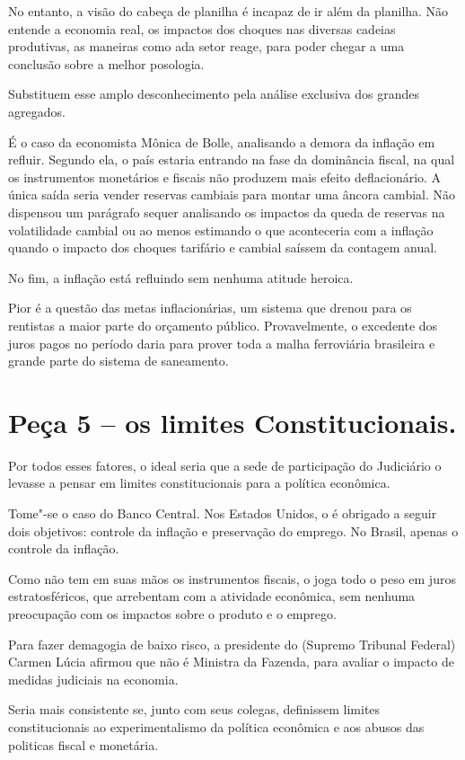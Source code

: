 No entanto, a visão do cabeça de planilha é incapaz de ir além da
planilha. Não entende a economia real, os impactos dos choques nas
diversas cadeias produtivas, as maneiras como ada setor reage, para
poder chegar a uma conclusão sobre a melhor posologia.

Substituem esse amplo desconhecimento pela análise exclusiva dos grandes
agregados.

É o caso da economista Mônica de Bolle, analisando a demora da inflação
em refluir. Segundo ela, o país estaria entrando na fase da dominância
fiscal, na qual os instrumentos monetários e fiscais não produzem mais
efeito deflacionário. A única saída seria vender reservas cambiais para
montar uma âncora cambial. Não dispensou um parágrafo sequer analisando
os impactos da queda de reservas na volatilidade cambial ou ao menos
estimando o que aconteceria com a inflação quando o impacto dos choques
tarifário e cambial saíssem da contagem anual.

No fim, a inflação está refluindo sem nenhuma atitude heroica.

Pior é a questão das metas inflacionárias, um sistema que drenou para os
rentistas a maior parte do orçamento público. Provavelmente, o excedente
dos juros pagos no período daria para prover toda a malha ferroviária
brasileira e grande parte do sistema de saneamento.

\section{Peça 5 -- os limites Constitucionais.}

Por todos esses fatores, o ideal seria que a sede de participação do
Judiciário o levasse a pensar em limites constitucionais para a política
econômica.

Tome"-se o caso do Banco Central. Nos Estados Unidos, o  é obrigado a
seguir dois objetivos: controle da inflação e preservação do emprego. No
Brasil, apenas o controle da inflação.

Como não tem em suas mãos os instrumentos fiscais, o  joga todo o peso
em juros estratosféricos, que arrebentam com a atividade econômica, sem
nenhuma preocupação com os impactos sobre o produto e o emprego.

Para fazer demagogia de baixo risco, a presidente do  (Supremo
Tribunal Federal) Carmen Lúcia afirmou que não é Ministra da Fazenda,
para avaliar o impacto de medidas judiciais na economia.

Seria mais consistente se, junto com seus colegas, definissem limites
constitucionais ao experimentalismo da política econômica e aos abusos
das politicas fiscal e monetária.
